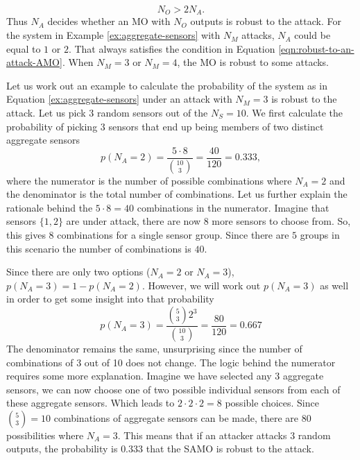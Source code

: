 \begin{equation}\label{eqn:robust-to-an-attack-SAMO}
    N_O > 2N_A.
\end{equation}
Thus $N_A$ decides whether an MO with $N_O$ outputs is robust to the attack. For the system in Example \ref{ex:aggregate-sensors} with $N_M$ attacks, $N_A$ could be equal to $1$ or $2$. That always satisfies the condition in Equation \eqref{eqn:robust-to-an-attack-AMO}. When $N_M=3$ or $N_M=4$, the MO is robust to some attacks.
\begin{example}\label{ex:LAMO-probability}
    Let us work out an example to calculate the probability of the system as in Equation \ref{ex:aggregate-sensors} under an attack with $N_M=3$ is robust to the attack. Let us pick $3$ random sensors out of the $N_S=10$. We first calculate the probability of picking 3 sensors that end up being members of two distinct aggregate sensors
    \begin{equation*}
        p(N_A=2) = \frac{\displaystyle 5 \cdot 8}{\displaystyle  \binom{10}{3}} = \frac{40}{120} = 0.333,
    \end{equation*}
    where the numerator is the number of possible combinations where $N_A=2$ and the denominator is the total number of combinations. Let us further explain the rationale behind the $5 \cdot 8 = 40$ combinations in the numerator. Imagine that sensors $\{1,2\}$ are under attack, there are now $8$ more sensors to choose from. So, this gives $8$ combinations for a single sensor group. Since there are $5$ groups in this scenario the number of combinations is $40$. 
    
    Since there are only two options ($N_A = 2$ or $N_A=3$), $p(N_A=3)=1-p(N_A=2)$. However, we will work out $p(N_A=3)$ as well in order to get some insight into that probability
    \begin{equation*}
        p(N_A=3) = \frac{\displaystyle \binom{5}{3}2^3}{\displaystyle \binom{10}{3}} = \frac{80}{120} = 0.667
    \end{equation*}
    The denominator remains the same, unsurprising since the number of combinations of 3 out of 10 does not change. The logic behind the numerator requires some more explanation. Imagine we have selected any $3$ aggregate sensors, we can now choose one of two possible individual sensors from each of these aggregate sensors. Which leads to $2\cdot2\cdot2=8$ possible choices. Since $\binom{5}{3}=10$ combinations of aggregate sensors can be made, there are $80$ possibilities where $N_A=3$. This means that if an attacker attacks $3$ random outputs, the probability is $0.333$ that the SAMO is robust to the attack.
\end{example}
